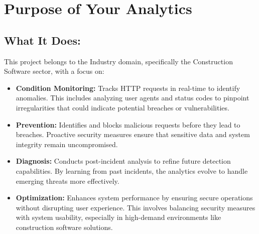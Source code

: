 %
%

\chapter{Purpose of Your Analytics}

\section{What It Does:}

This project belongs to the Industry domain, specifically the Construction Software sector, with a focus on:

\begin{itemize}
	\item \textbf{Condition Monitoring:} Tracks HTTP requests in real-time to identify anomalies. This includes analyzing user agents and status codes to pinpoint irregularities that could indicate potential breaches or vulnerabilities.
	\item \textbf{Prevention:} Identifies and blocks malicious requests before they lead to breaches. Proactive security measures ensure that sensitive data and system integrity remain uncompromised.
	\item \textbf{Diagnosis:} Conducts post-incident analysis to refine future detection capabilities. By learning from past incidents, the analytics evolve to handle emerging threats more effectively.
	\item \textbf{Optimization:} Enhances system performance by ensuring secure operations without disrupting user experience. This involves balancing security measures with system usability, especially in high-demand environments like construction software solutions.
\end{itemize}

  

 